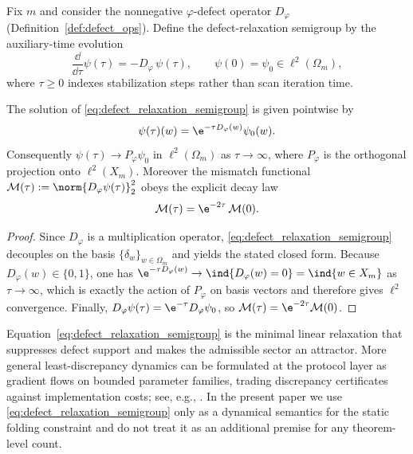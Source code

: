\begin{definition}\label{def:defect_relaxation}
Fix $m$ and consider the nonnegative $\varphi$-defect operator $D_\varphi$ (Definition~\ref{def:defect_ops}).
Define the defect-relaxation semigroup by the auxiliary-time evolution
\begin{equation}
\label{eq:defect_relaxation_semigroup}
\frac{\dd}{\dd\tau}\psi(\tau)=-D_\varphi\,\psi(\tau),
\qquad
\psi(0)=\psi_0\in\ell^2(\Omega_m),
\end{equation}
where $\tau\ge 0$ indexes stabilization steps rather than scan iteration time.
\end{definition}

\begin{proposition}\label{prop:defect_relaxation_to_phi}
The solution of \eqref{eq:defect_relaxation_semigroup} is given pointwise by
\[
\psi(\tau)(w)=\e^{-\tau D_\varphi(w)}\psi_0(w).
\]
Consequently $\psi(\tau)\to P_\varphi\psi_0$ in $\ell^2(\Omega_m)$ as $\tau\to\infty$, where $P_\varphi$ is the orthogonal projection onto $\ell^2(X_m)$.
Moreover the mismatch functional $\mathcal{M}(\tau):=\norm{D_\varphi\psi(\tau)}_2^2$ obeys the explicit decay law
\[
\mathcal{M}(\tau)=\e^{-2\tau}\,\mathcal{M}(0).
\]
\end{proposition}
\begin{proof}
Since $D_\varphi$ is a multiplication operator, \eqref{eq:defect_relaxation_semigroup} decouples on the basis $\{\delta_w\}_{w\in\Omega_m}$ and yields the stated closed form.
Because $D_\varphi(w)\in\{0,1\}$, one has $\e^{-\tau D_\varphi(w)}\to \ind\{D_\varphi(w)=0\}=\ind\{w\in X_m\}$ as $\tau\to\infty$, which is exactly the action of $P_\varphi$ on basis vectors and therefore gives $\ell^2$ convergence.
Finally, $D_\varphi\psi(\tau)=\e^{-\tau}D_\varphi\psi_0$, so $\mathcal{M}(\tau)=\e^{-2\tau}\mathcal{M}(0)$.
\end{proof}

\begin{remark}\label{rem:stability_relaxation_context}
Equation~\eqref{eq:defect_relaxation_semigroup} is the minimal linear relaxation that suppresses defect support and makes the admissible sector an attractor.
More general least-discrepancy dynamics can be formulated at the protocol layer as gradient flows on bounded parameter families, trading discrepancy certificates against implementation costs; see, e.g., \cite{Ma2025CAP,Ma2025HHU,Ma2025HPT,Ma2025CAPII}.
In the present paper we use \eqref{eq:defect_relaxation_semigroup} only as a dynamical semantics for the static folding constraint and do not treat it as an additional premise for any theorem-level count.
\end{remark}

